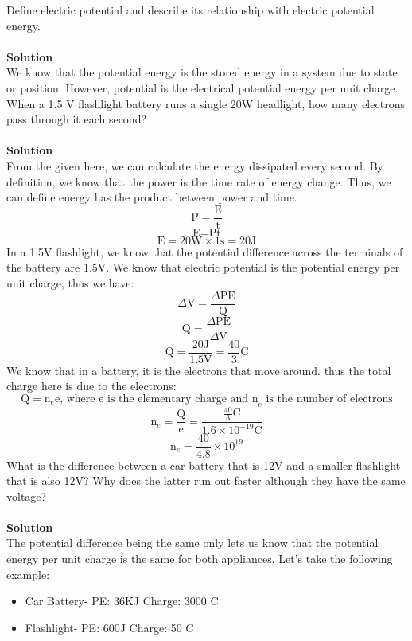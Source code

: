 \documentclass[9pt,addpoints]{exam}
\begin{document}
	\begin{questions}
		\question Define electric potential and describe its relationship with electric potential energy. \\ \\
		\textbf{Solution}\\
		We know that the potential energy is the stored energy in a system due to state or position. However, potential is the electrical potential energy per unit charge.
		\question When a 1.5 V flashlight battery runs a single 20W headlight, how many electrons pass through it each second?\\ \\
		\textbf{Solution}\\
		From the given here, we can calculate the energy dissipated every second. By definition, we know that the power is the time rate of energy change. Thus, we can define energy has the product between power and time.
		$$\text{P}=\dfrac{\text{E}}{\text{t}}$$
		$$\text{E}=\text{Pt}$$
		$$\text{E}=20\text{W}\times1\text{s}=20\text{J}$$
		In a 1.5V flashlight, we know that the potential difference across the terminals of the battery are 1.5V. We know that electric potential is the potential energy per unit charge, thus we have:
		$$\Delta\text{V}=\dfrac{\Delta\text{PE}}{\text{Q}}$$
		$$\text{Q}=\dfrac{\Delta\text{PE}}{\Delta\text{V}}$$
		$$\text{Q}=\dfrac{20\text{J}}{1.5\text{V}}=\dfrac{40}{3}\text{C}$$
		We know that in a battery, it is the electrons that move around. thus the total charge here is due to the electrons:
		$$\text{Q}=\text{n}_e\text{e}\text{, where e is the elementary charge and n}_e\text{ is the number of electrons}$$
		$$\text{n}_e=\dfrac{\text{Q}}{\text{e}}=\dfrac{\frac{40}{3}\text{C}}{1.6\times10^{-19}\text{C}}$$
		$$\text{n}_e=\dfrac{40}{4.8}\times10^{19}$$
		\question What is the difference between a car battery that is 12V and a smaller flashlight that is also 12V? Why does the latter run out faster although they have the same voltage?\\ \\
		\newpage
		\textbf{Solution}\\
		The potential difference being the same only lets us know that the potential energy per unit charge is the same for both appliances. Let's take the following example:
		\begin{itemize}
			\item Car Battery- PE: 36KJ  Charge: 3000 C 
			\item Flashlight- PE: 600J   Charge: 50 C
		\end{itemize}

\end{questions}
\end{document}
